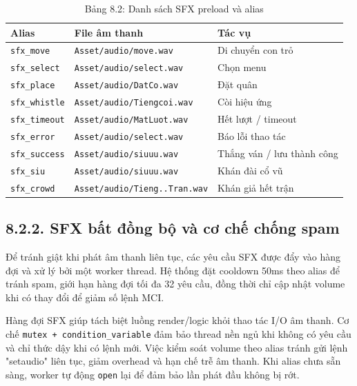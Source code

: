 \begin{table}[H]
\caption*{Bảng 8.2: Danh sách SFX preload và alias}
\label{tbl:ch8_sfx_alias}
\centering
\renewcommand{\arraystretch}{0.9}
\begin{tabularx}{\linewidth}{|L{3.0cm}|L{7.0cm}|X|}
\hline
\textbf{Alias} & \textbf{File âm thanh} & \textbf{Tác vụ} \\ \hline
\texttt{sfx\_move} & \texttt{Asset/audio/move.wav} & Di chuyển con trỏ \\ \hline
\texttt{sfx\_select} & \texttt{Asset/audio/select.wav} & Chọn menu \\ \hline
\texttt{sfx\_place} & \texttt{Asset/audio/DatCo.wav} & Đặt quân \\ \hline
\texttt{sfx\_whistle} & \texttt{Asset/audio/Tiengcoi.wav} & Còi hiệu ứng \\ \hline
\texttt{sfx\_timeout} & \texttt{Asset/audio/MatLuot.wav} & Hết lượt / timeout \\ \hline
\texttt{sfx\_error} & \texttt{Asset/audio/select.wav} & Báo lỗi thao tác \\ \hline
\texttt{sfx\_success} & \texttt{Asset/audio/siuuu.wav} & Thắng ván / lưu thành công \\ \hline
\texttt{sfx\_siu} & \texttt{Asset/audio/siuuu.wav} & Khán đài cổ vũ \\ \hline
\texttt{sfx\_crowd} & \texttt{Asset/audio/Tieng..Tran.wav} & Khán giả hết trận \\ \hline
\end{tabularx}
\end{table}

\subsection*{8.2.2. SFX bất đồng bộ và cơ chế chống spam}

\setlength{\parindent}{1.5em} Để tránh giật khi phát âm thanh liên tục, các yêu cầu SFX được đẩy vào hàng đợi và xử lý bởi một worker thread. Hệ thống đặt cooldown 50ms theo alias để tránh spam, giới hạn hàng đợi tối đa 32 yêu cầu, đồng thời chỉ cập nhật volume khi có thay đổi để giảm số lệnh MCI.

\setlength{\parindent}{1.5em} Hàng đợi SFX giúp tách biệt luồng render/logic khỏi thao tác I/O âm thanh. Cơ chế \texttt{mutex + condition\_variable} đảm bảo thread nền ngủ khi không có yêu cầu và chỉ thức dậy khi có lệnh mới. Việc kiểm soát volume theo alias tránh gửi lệnh "setaudio" liên tục, giảm overhead và hạn chế trễ âm thanh. Khi alias chưa sẵn sàng, worker tự động \texttt{open} lại để đảm bảo lần phát đầu không bị rớt.

